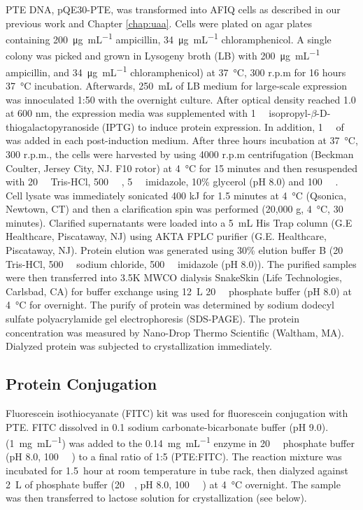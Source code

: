 \begin{refsection}
PTE DNA, pQE30-PTE, was transformed into AFIQ cells as described in our previous
work\cite{Yang2014a} and Chapter \ref{chap:uaa}. Cells were plated on agar
plates containing \SI{200}{\ug\per\mL} ampicillin, \SI{34}{\ug\per\mL}
chloramphenicol. A single colony was picked and grown in Lysogeny broth (LB)
with \SI{200}{\ug\per\mL} ampicillin, and \SI{34}{\ug\per\mL} chloramphenicol)
at \SI{37}{\celsius}, 300 r.p.m for 16 hours \SI{37}{\celsius} incubation.
Afterwards, \SI{250}{\mL} of LB medium for large-scale expression was
innoculated 1:50 with the overnight culture.  After optical density reached 1.0
at 600 nm, the expression media was supplemented with \SI{1}{\milli\Molar}
isopropyl-$\beta$-D-thiogalactopyranoside (IPTG) to induce protein expression.
In addition, \SI{1}{\milli\Molar} of  was added in each
post-induction medium.  After three hours incubation at \SI{37}{\celsius}, 300
r.p.m., the cells were harvested by using 4000 r.p.m centrifugation (Beckman
Coulter, Jersey City, NJ.  F10 rotor) at \SI{4}{\celsius} for 15 minutes and
then resuspended with \SI{20}{\milli\Molar} Tris-HCl, \SI{500}{\milli\Molar}
, \SI{5}{\milli\Molar} imidazole, 10\% glycerol (pH 8.0) and
\SI{100}{\micro\Molar} . Cell lysate was immediately sonicated 400 kJ
for 1.5 minutes at \SI{4}{\celsius} (Qsonica, Newtown, CT) and then a
clarification spin was performed (20,000 g, \SI{4}{\celsius}, 30 minutes).
Clarified supernatants were loaded into a \SI{5}{\mL} His Trap column (G.E
Healthcare, Piscataway, NJ) using AKTA FPLC purifier (G.E.  Healthcare,
Piscataway, NJ).  Protein elution was generated using 30\% elution buffer B
(\SI{20}{\milli\Molar} Tris-HCl, \SI{500}{\milli\Molar} sodium chloride,
\SI{500}{\milli\Molar} imidazole (pH 8.0)). The purified samples were then
transferred into 3.5K MWCO dialysis SnakeSkin (Life Technologies, Carlsbad, CA)
for buffer exchange using \SI{12}{\L} \SI{20}{\milli\Molar} phosphate buffer
(pH 8.0) at \SI{4}{\celsius} for overnight. The purify of protein was
determined by sodium dodecyl sulfate polyacrylamide gel electrophoresis
(SDS-PAGE). The protein concentration was measured by Nano-Drop Thermo
Scientific (Waltham, MA).  Dialyzed protein was subjected to crystallization
immediately.

\subsection{Protein Conjugation}

Fluorescein isothiocyanate (FITC) kit was used for fluorescein conjugation with
PTE. FITC dissolved in \SI{0.1}{\Molar} sodium carbonate-bicarbonate buffer (pH
9.0).  (\SI{1}{\mg\per\mL}) was added to the \SI{0.14}{\mg\per\mL} enzyme in
\SI{20}{\milli\Molar} phosphate buffer (pH 8.0, \SI{100}{\micro\Molar}
) to a final ratio of 1:5 (PTE:FITC). The reaction mixture was
incubated for \SI{1.5}{hour} at room temperature in tube rack, then dialyzed
against \SI{2}{\liter} of phosphate buffer (\SI{20}{\milli\Molar}, pH 8.0,
\SI{100}{\micro\Molar} ) at \SI{4}{\celsius} overnight.  The sample
was then transferred to lactose solution for crystallization (see below).


\end{refsection}

